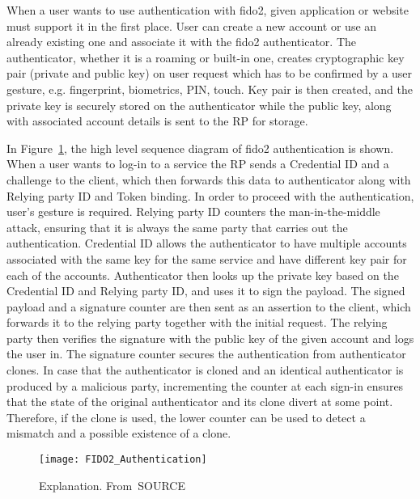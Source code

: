 When a user wants to use authentication with \acrshort{fido}2, given application or website must support it in the first place. User can create a new account or use an already existing one and associate it with the \acrshort{fido}2 authenticator. The authenticator, whether it is a roaming or built-in one, creates cryptographic key pair (private and public key) on user request which has to be confirmed by a user gesture, e.g. fingerprint, biometrics, PIN, touch. Key pair is then created, and the private key is securely stored on the authenticator while the public key, along with associated account details is sent to the RP for storage.

In Figure~\ref{fig:fido2_authentication}, the high level sequence diagram of \acrshort{fido}2 authentication is shown. When a user wants to log-in to a service the RP sends a Credential ID and a challenge to the client, which then forwards this data to authenticator along with Relying party ID and Token binding. In order to proceed with the authentication, user's gesture is required. Relying party ID counters the man-in-the-middle attack, ensuring that it is always the same party that carries out the authentication. Credential ID allows the authenticator to have multiple accounts associated with the same key for the same service and have different key pair for each of the accounts. Authenticator then looks up the private key based on the Credential ID and Relying party ID, and uses it to sign the payload. The signed payload and a signature counter are then sent as an assertion to the client, which forwards it to the relying party together with the initial request. The relying party then verifies the signature with the public key of the given account and logs the user in. The signature counter secures the authentication from authenticator clones. In case that the authenticator is cloned and an identical authenticator is produced by a malicious party, incrementing the counter at each sign-in ensures that the state of the original authenticator and its clone divert at some point. Therefore, if the clone is used, the lower counter can be used to detect a mismatch and a possible existence of a clone.

\begin{figure}[ht]
    \centering
    \texttt{[image: FIDO2\_Authentication]}
    \caption{Explanation. From~\cite{}SOURCE}
    \label{fig:fido2_authentication}
\end{figure}
